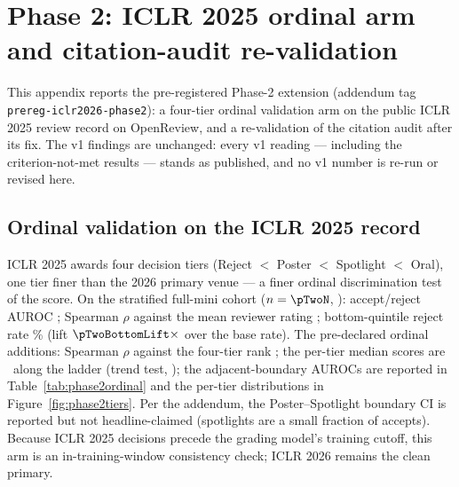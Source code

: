 \section{Phase 2: ICLR 2025 ordinal arm and citation-audit re-validation}
\label{app:phase2}

This appendix reports the pre-registered Phase-2 extension (addendum tag
\texttt{prereg-iclr2026-phase2}): a four-tier ordinal validation arm on the
public ICLR 2025 review record on OpenReview, and a re-validation of the
citation audit after its fix. The v1 findings are unchanged: every v1
reading --- including the criterion-not-met results --- stands as published,
and no v1 number is re-run or revised here.

\subsection{Ordinal validation on the ICLR 2025 record}
\label{app:phase2:ordinal}

ICLR 2025 awards four decision tiers (Reject $<$ Poster $<$ Spotlight $<$
Oral), one tier finer than the 2026 primary venue --- a finer ordinal
discrimination test of the score. On the stratified full-mini cohort
($n=\pTwoN$, \pTwoVenue): accept/reject AUROC \pTwoAurocFull; Spearman
$\rho$ against the mean reviewer rating \pTwoSpearmanRatingFull;
bottom-quintile reject rate \pTwoBottomReject\% (lift
$\pTwoBottomLift\times$ over the base rate). The pre-declared ordinal
additions: Spearman $\rho$ against the four-tier rank
\pTwoSpearmanTierFull; the per-tier median scores are \pTwoMonotone\ along
the ladder (trend test, \pTwoTrendPrel); the adjacent-boundary AUROCs are
reported in Table~\ref{tab:phase2ordinal} and the per-tier distributions in
Figure~\ref{fig:phase2tiers}. Per the addendum, the Poster--Spotlight
boundary CI is reported but not headline-claimed (spotlights are a small
fraction of accepts). Because ICLR 2025 decisions precede the grading
model's training cutoff, this arm is an in-training-window consistency
check; ICLR 2026 remains the clean primary.

